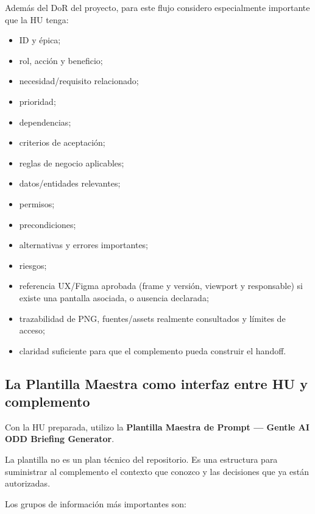 \documentclass[11pt,a4paper]{article}
\begin{document}
Además del DoR del proyecto, para este flujo considero especialmente importante que la HU tenga:

\begin{itemize}
    \item ID y épica;
    \item rol, acción y beneficio;
    \item necesidad/requisito relacionado;
    \item prioridad;
    \item dependencias;
    \item criterios de aceptación;
    \item reglas de negocio aplicables;
    \item datos/entidades relevantes;
    \item permisos;
    \item precondiciones;
    \item alternativas y errores importantes;
    \item riesgos;
    \item referencia UX/Figma aprobada (frame y versión, viewport y responsable) si existe una pantalla asociada, o ausencia declarada;
    \item trazabilidad de PNG, fuentes/assets realmente consultados y límites de acceso;
    \item claridad suficiente para que el complemento pueda construir el handoff.
\end{itemize}

\subsection{La Plantilla Maestra como interfaz entre HU y complemento}

Con la HU preparada, utilizo la \textbf{Plantilla Maestra de Prompt — Gentle AI ODD Briefing Generator}.

La plantilla no es un plan técnico del repositorio. Es una estructura para suministrar al complemento el contexto que conozco y las decisiones que ya están autorizadas.

Los grupos de información más importantes son:
\end{document}
